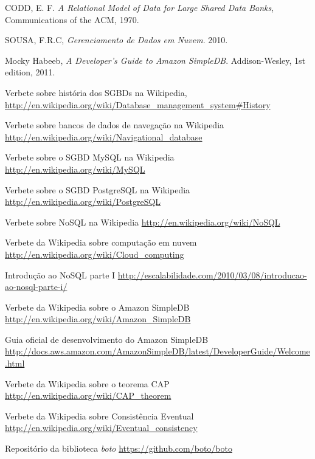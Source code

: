 \begin{thebibliography}{9}
  CODD, E. F.
  \emph{A Relational Model of Data for Large Shared Data Banks},
  Communications of the ACM,
  1970.
  
  SOUSA, F.R.C,
  \emph{Gerenciamento de Dados em Nuvem}.
  2010.
  
  Mocky Habeeb,
  \emph{A Developer's Guide to Amazon SimpleDB}.
  Addison-Wesley,
  1st edition,
  2011.  
  
  Verbete sobre história dos SGBDs na Wikipedia,
  \url{http://en.wikipedia.org/wiki/Database_management_system#History}
  
  Verbete sobre bancos de dados de navegação na Wikipedia
  \url{http://en.wikipedia.org/wiki/Navigational_database}
  
  Verbete sobre o SGBD MySQL na Wikipedia
  \url{http://en.wikipedia.org/wiki/MySQL}
  
  Verbete sobre o SGBD PostgreSQL na Wikipedia
  \url{http://en.wikipedia.org/wiki/PostgreSQL}
  
  Verbete sobre NoSQL na Wikipedia
  \url{http://en.wikipedia.org/wiki/NoSQL}
  
  Verbete da Wikipedia sobre computação em nuvem
  \url{http://en.wikipedia.org/wiki/Cloud_computing}  
  
  Introdução ao NoSQL parte I
  \url{http://escalabilidade.com/2010/03/08/introducao-ao-nosql-parte-i/}
  
  Verbete da Wikipedia sobre o Amazon SimpleDB
  \url{http://en.wikipedia.org/wiki/Amazon_SimpleDB}
  
  Guia oficial de desenvolvimento do Amazon SimpleDB
  \url{http://docs.aws.amazon.com/AmazonSimpleDB/latest/DeveloperGuide/Welcome.html}  
  
  Verbete da Wikipedia sobre o teorema CAP
  \url{http://en.wikipedia.org/wiki/CAP_theorem}
  
  Verbete da Wikipedia sobre Consistência Eventual
  \url{http://en.wikipedia.org/wiki/Eventual_consistency}
  
  Repositório da biblioteca \textit{boto}
  \url{https://github.com/boto/boto}
\end{thebibliography}